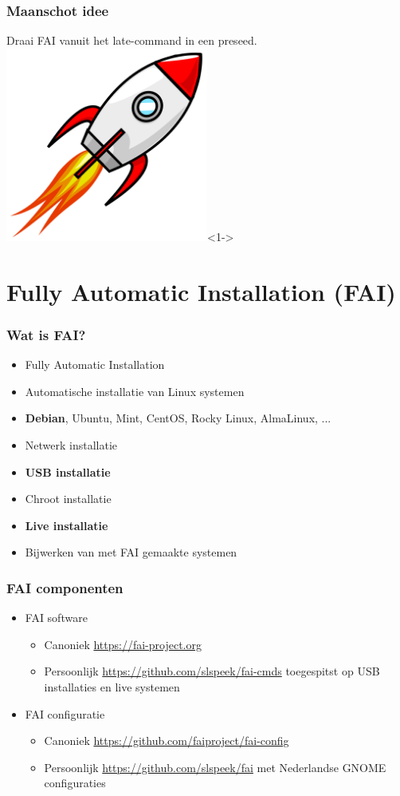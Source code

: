 \documentclass{beamer}
\newcommand{\myfaiconfig}{https://github.com/slspeek/fai}
\newcommand{\myfaicmds}{https://github.com/slspeek/fai-cmds}
\begin{document}
\begin{frame}
\frametitle{Maanschot idee}
Draai FAI vanuit het late-command in een preseed.
\centering
\includegraphics[width=0.5\textwidth]{img/Cartoon_space_rocket.png}<1->
\end{frame}

\section{Fully Automatic Installation (FAI)}


\begin{frame}
\frametitle{Wat is FAI?}
\begin{itemize}
  \item Fully Automatic Installation
  \item Automatische installatie van Linux systemen
  \item \textbf{Debian}, Ubuntu, Mint, CentOS, Rocky Linux, AlmaLinux, ...
  \item Netwerk installatie
  \item \textbf{USB installatie}
  \item Chroot installatie
  \item \textbf{Live installatie}
  \item Bijwerken van met FAI gemaakte systemen
\end{itemize}
\end{frame}

\begin{frame}
\frametitle{FAI componenten}
\begin{itemize}
  \item FAI software
  \begin{itemize}
    \item Canoniek \url{https://fai-project.org}
    \item Persoonlijk \url{\myfaicmds} toegespitst op USB
     installaties en live systemen
  \end{itemize}
  \item FAI configuratie
  \begin{itemize}
    \item Canoniek \url{https://github.com/faiproject/fai-config}
    \item Persoonlijk \url{\myfaiconfig} met Nederlandse GNOME configuraties
  \end{itemize}
\end{itemize}
\end{frame}
\end{document}
